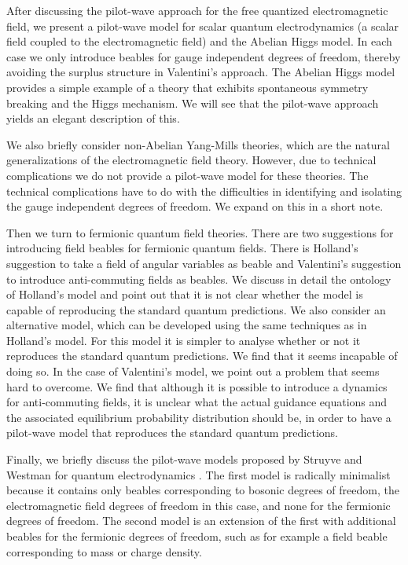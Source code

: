 \documentclass[12pt]{article}
\begin{document}
After discussing the pilot-wave approach for the free quantized electromagnetic field, we present a pilot-wave model for scalar quantum electrodynamics (a scalar field coupled to the electromagnetic field) and the Abelian Higgs model. In each case we only introduce beables for gauge independent degrees of freedom, thereby avoiding the surplus structure in Valentini's approach. The Abelian Higgs model provides a simple example of a theory that exhibits spontaneous symmetry breaking and the Higgs mechanism. We will see that the pilot-wave approach yields an elegant description of this. 

We also briefly consider non-Abelian Yang-Mills theories, which are the natural generalizations of the electromagnetic field theory. However, due to technical complications we do not provide a pilot-wave model for these theories. The technical complications have to do with the difficulties in identifying and isolating the gauge independent degrees of freedom. We expand on this in a short note.

Then we turn to fermionic quantum field theories. There are two suggestions for introducing field beables for fermionic quantum fields. There is Holland's suggestion \cite{holland881,holland93b} to take a field of angular variables as beable and Valentini's suggestion \cite{valentini92,valentini96} to introduce anti-commuting fields as beables. We discuss in detail the ontology of Holland's model and point out that it is not clear whether the model is capable of reproducing the standard quantum predictions. We also consider an alternative model, which can be developed using the same techniques as in Holland's model. For this model it is simpler to analyse whether or not it reproduces the standard quantum predictions. We find that it seems incapable of doing so. In the case of Valentini's model, we point out a problem that seems hard to overcome. We find that although it is possible to introduce a dynamics for anti-commuting fields, it is unclear what the actual guidance equations and the associated equilibrium probability distribution should be, in order to have a pilot-wave model that reproduces the standard quantum predictions.

Finally, we briefly discuss the pilot-wave models proposed by Struyve and Westman for quantum electrodynamics \cite{struyve06,struyve07c}. The first model is radically minimalist because it contains only beables corresponding to bosonic degrees of freedom, the electromagnetic field degrees of freedom in this case, and none for the fermionic degrees of freedom. The second model is an extension of the first with additional beables for the fermionic degrees of freedom, such as for example a field beable corresponding to mass or charge density. 
\end{document}

